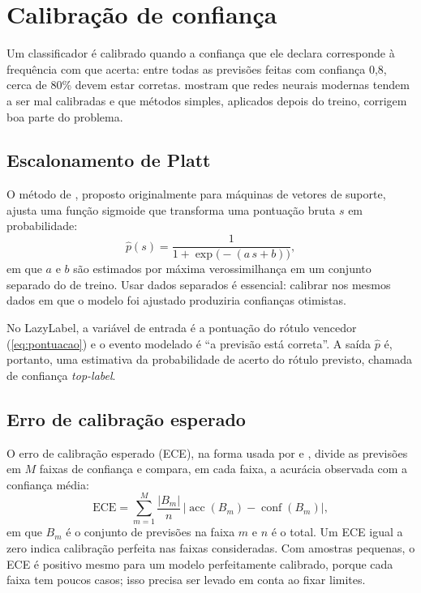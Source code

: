 \section{Calibração de confiança}
\label{sec:calibracao}

Um classificador é calibrado quando a confiança que ele declara corresponde à frequência com que acerta: entre todas as previsões feitas com confiança 0{,}8, cerca de 80\% devem estar corretas.  mostram que redes neurais modernas tendem a ser mal calibradas e que métodos simples, aplicados depois do treino, corrigem boa parte do problema.

\subsection{Escalonamento de Platt}

O método de , proposto originalmente para máquinas de vetores de suporte, ajusta uma função sigmoide que transforma uma pontuação bruta $s$ em probabilidade:
\begin{equation}
  \hat{p}(s) = \frac{1}{1 + \exp\!\big(-(a\,s + b)\big)},
  \label{eq:platt}
\end{equation}
em que $a$ e $b$ são estimados por máxima verossimilhança em um conjunto separado do de treino. Usar dados separados é essencial: calibrar nos mesmos dados em que o modelo foi ajustado produziria confianças otimistas.

No LazyLabel, a variável de entrada é a pontuação do rótulo vencedor (\autoref{eq:pontuacao}) e o evento modelado é ``a previsão está correta''. A saída $\hat{p}$ é, portanto, uma estimativa da probabilidade de acerto do rótulo previsto, chamada de confiança \emph{top-label}.

\subsection{Erro de calibração esperado}

O erro de calibração esperado (ECE), na forma usada por  e , divide as previsões em $M$ faixas de confiança e compara, em cada faixa, a acurácia observada com a confiança média:
\begin{equation}
  \mathrm{ECE} = \sum_{m=1}^{M} \frac{|B_m|}{n}\,\Big|\operatorname{acc}(B_m) - \operatorname{conf}(B_m)\Big|,
  \label{eq:ece}
\end{equation}
em que $B_m$ é o conjunto de previsões na faixa $m$ e $n$ é o total. Um ECE igual a zero indica calibração perfeita nas faixas consideradas. Com amostras pequenas, o ECE é positivo mesmo para um modelo perfeitamente calibrado, porque cada faixa tem poucos casos; isso precisa ser levado em conta ao fixar limites.

